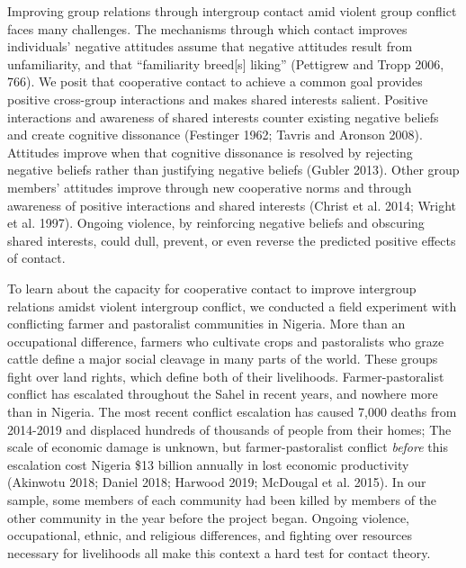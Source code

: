 \documentclass[11pt]{article}
\begin{document}
Improving group relations through intergroup contact amid violent group
conflict faces many challenges. The mechanisms through which contact
improves individuals' negative attitudes assume that negative attitudes
result from unfamiliarity, and that ``familiarity breed{[}s{]} liking''
(Pettigrew and Tropp 2006, 766). We posit that cooperative contact to
achieve a common goal provides positive cross-group interactions and
makes shared interests salient. Positive interactions and awareness of
shared interests counter existing negative beliefs and create cognitive
dissonance (Festinger 1962; Tavris and Aronson 2008). Attitudes improve
when that cognitive dissonance is resolved by rejecting negative beliefs
rather than justifying negative beliefs (Gubler 2013). Other group
members' attitudes improve through new cooperative norms and through
awareness of positive interactions and shared interests (Christ et al.
2014; Wright et al. 1997). Ongoing violence, by reinforcing negative
beliefs and obscuring shared interests, could dull, prevent, or even
reverse the predicted positive effects of contact.

To learn about the capacity for cooperative contact to improve
intergroup relations amidst violent intergroup conflict, we conducted a
field experiment with conflicting farmer and pastoralist communities in
Nigeria. More than an occupational difference, farmers who cultivate
crops and pastoralists who graze cattle define a major social cleavage
in many parts of the world. These groups fight over land rights, which
define both of their livelihoods. Farmer-pastoralist conflict has
escalated throughout the Sahel in recent years, and nowhere more than in
Nigeria. The most recent conflict escalation has caused 7,000 deaths
from 2014-2019 and displaced hundreds of thousands of people from their
homes; The scale of economic damage is unknown, but farmer-pastoralist
conflict \emph{before} this escalation cost Nigeria \$13 billion
annually in lost economic productivity (Akinwotu 2018; Daniel 2018;
Harwood 2019; McDougal et al. 2015). In our sample, some members of each
community had been killed by members of the other community in the year
before the project began. Ongoing violence, occupational, ethnic, and
religious differences, and fighting over resources necessary for
livelihoods all make this context a hard test for contact theory.
\end{document}
